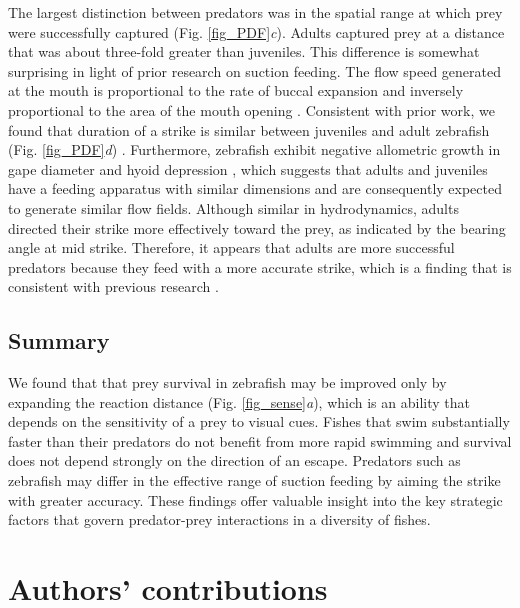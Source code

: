 \documentclass[]{rsos}%
\begin{document}
The largest distinction between predators was in the spatial range at which prey were successfully captured (Fig. \ref{fig_PDF}\textit{c}).
Adults captured prey at a distance that was about three-fold greater than juveniles.
This difference is somewhat surprising in light of prior research on suction feeding. 
The flow speed generated at the mouth is proportional to the rate of buccal expansion and inversely proportional to the area of the mouth opening \cite{Holzman:2008jc,Muller:1982p335}.
Consistent with prior work, we found that duration of a strike is similar between juveniles and adult zebrafish (Fig. \ref{fig_PDF}\textit{d}) \cite{Hernandez:2000uma}.
Furthermore, zebrafish exhibit negative allometric growth in gape diameter and hyoid depression \cite{Hernandez:2000uma}, which suggests that adults and juveniles have a feeding apparatus with similar dimensions and are consequently expected to generate similar flow fields.
Although similar in hydrodynamics, adults directed their strike more effectively toward the prey, as indicated by the bearing angle at mid strike.
Therefore, it appears that adults are more successful predators because they feed with a more accurate strike, which is a finding that is consistent with previous research \cite{Kane:2014bh}.


\subsection*{Summary} 

We found that that prey survival in zebrafish may be improved only by expanding the reaction distance (Fig. \ref{fig_sense}\textit{a}), which is an ability that depends on the sensitivity of a prey to visual cues. 
Fishes that swim substantially faster than their predators do not benefit from more rapid swimming and survival does not depend strongly on the direction of an escape.
Predators such as zebrafish may differ in the effective range of suction feeding by aiming the strike with greater accuracy.
These findings offer valuable insight into the key strategic factors that govern predator-prey interactions in a diversity of fishes. 




\section*{Authors' contributions}
\end{document}
